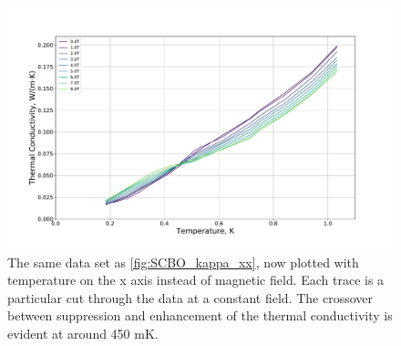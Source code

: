 \documentclass{thesis-umich}
\begin{document}
\begin{figure}
	\caption[Temperature Dependence of SCBO Thermal Conductivity]{The same data set as \ref{fig:SCBO_kappa_xx}, now plotted with temperature on the x axis instead of magnetic field. Each trace is a particular cut through the data at a constant field. The crossover between suppression and enhancement of the thermal conductivity is evident at around 450 mK.}
	\label{fig:SCBO_kappa_xx_vs_T}
	\includegraphics[width=\columnwidth]{figures/SCBO_kappa_vs_T.pdf}
\end{figure}
\end{document}
